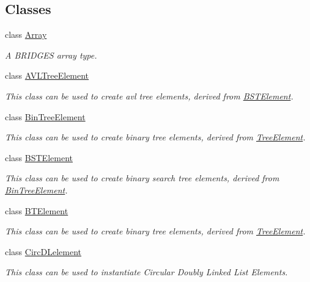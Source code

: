 \subsection*{Classes}
\begin{DoxyCompactItemize}
\item 
class \mbox{\hyperlink{classbridges_1_1_array}{Array}}
\begin{DoxyCompactList}\small\item\em A B\+R\+I\+D\+G\+ES array type. \end{DoxyCompactList}\item 
class \mbox{\hyperlink{classbridges_1_1_a_v_l_tree_element}{A\+V\+L\+Tree\+Element}}
\begin{DoxyCompactList}\small\item\em This class can be used to create avl tree elements, derived from \mbox{\hyperlink{classbridges_1_1_b_s_t_element}{B\+S\+T\+Element}}. \end{DoxyCompactList}\item 
class \mbox{\hyperlink{classbridges_1_1_bin_tree_element}{Bin\+Tree\+Element}}
\begin{DoxyCompactList}\small\item\em This class can be used to create binary tree elements, derived from \mbox{\hyperlink{classbridges_1_1_tree_element}{Tree\+Element}}. \end{DoxyCompactList}\item 
class \mbox{\hyperlink{classbridges_1_1_b_s_t_element}{B\+S\+T\+Element}}
\begin{DoxyCompactList}\small\item\em This class can be used to create binary search tree elements, derived from \mbox{\hyperlink{classbridges_1_1_bin_tree_element}{Bin\+Tree\+Element}}. \end{DoxyCompactList}\item 
class \mbox{\hyperlink{classbridges_1_1_b_t_element}{B\+T\+Element}}
\begin{DoxyCompactList}\small\item\em This class can be used to create binary tree elements, derived from \mbox{\hyperlink{classbridges_1_1_tree_element}{Tree\+Element}}. \end{DoxyCompactList}\item 
class \mbox{\hyperlink{classbridges_1_1_circ_d_lelement}{Circ\+D\+Lelement}}
\begin{DoxyCompactList}\small\item\em This class can be used to instantiate Circular Doubly Linked List Elements. \end{DoxyCompactList}\item 

\end{DoxyCompactItemize}
